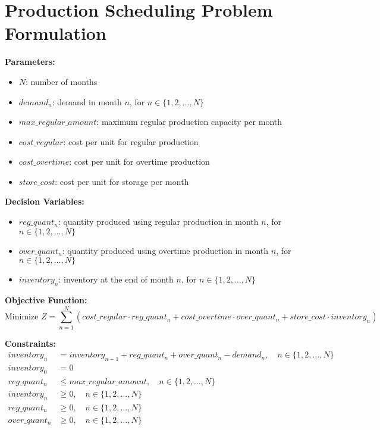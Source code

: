 \documentclass{article}
\begin{document}
\section*{Production Scheduling Problem Formulation}

\textbf{Parameters:}
\begin{itemize}
    \item $N$: number of months
    \item $demand_n$: demand in month $n$, for $n \in \{1, 2, \ldots, N\}$
    \item $max\_regular\_amount$: maximum regular production capacity per month
    \item $cost\_regular$: cost per unit for regular production
    \item $cost\_overtime$: cost per unit for overtime production
    \item $store\_cost$: cost per unit for storage per month
\end{itemize}

\textbf{Decision Variables:}
\begin{itemize}
    \item $reg\_quant_n$: quantity produced using regular production in month $n$, for $n \in \{1, 2, \ldots, N\}$
    \item $over\_quant_n$: quantity produced using overtime production in month $n$, for $n \in \{1, 2, \ldots, N\}$
    \item $inventory_n$: inventory at the end of month $n$, for $n \in \{1, 2, \ldots, N\}$
\end{itemize}

\textbf{Objective Function:}
\[
\text{Minimize } Z = \sum_{n=1}^{N} \left( cost\_regular \cdot reg\_quant_n + cost\_overtime \cdot over\_quant_n + store\_cost \cdot inventory_n \right)
\]

\textbf{Constraints:}
\begin{align}
    inventory_n & = inventory_{n-1} + reg\_quant_n + over\_quant_n - demand_n, \quad n \in \{1, 2, \ldots, N\} \\
    inventory_0 & = 0 \\
    reg\_quant_n & \leq max\_regular\_amount, \quad n \in \{1, 2, \ldots, N\} \\
    inventory_n & \geq 0, \quad n \in \{1, 2, \ldots, N\} \\
    reg\_quant_n & \geq 0, \quad n \in \{1, 2, \ldots, N\} \\
    over\_quant_n & \geq 0, \quad n \in \{1, 2, \ldots, N\}
\end{align}
\end{document}
